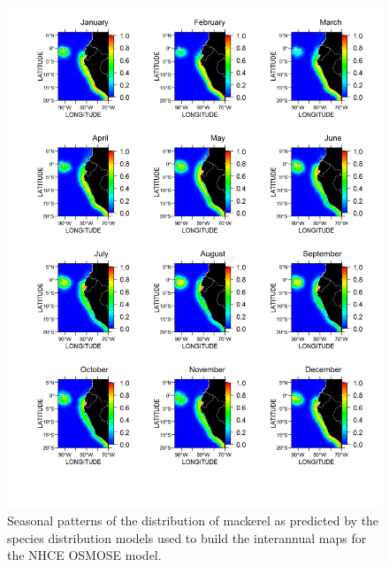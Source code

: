 \begin{figure}
\centering
\includegraphics[height=0.8\textheight]{figures/caballa-climatology}
\caption[Seasonal patterns of the distribution of mackerel]{Seasonal patterns of the distribution of mackerel as predicted by the species distribution models used to build the interannual maps for the NHCE OSMOSE model.}
\label{fig:caballa-climatology}
\end{figure}

